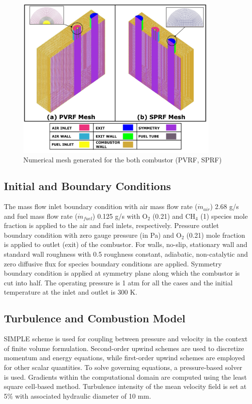 \begin{figure}[!ht]
    \centering
	\includegraphics[width=0.9\textwidth]{Chapter4/Images/Mesh.png}
	\caption{Numerical mesh generated for the both combustor (PVRF, SPRF)}
	\label{Mesh}
\end{figure}

\subsection{Initial and Boundary Conditions}
The mass flow inlet boundary condition with  air mass flow rate ($\dot{m}_{air}$) 2.68 g/s and fuel mass flow rate ($\dot{m}_{fuel}$) 0.125 g/s with O$_2$ (0.21) and CH$_4$ (1) species mole fraction  is applied to the air and fuel inlets, respectively.
Pressure outlet boundary condition with zero gauge pressure (in Pa) and O$_2$ (0.21) mole fraction is applied to outlet (exit) of the combustor.
For walls, no-slip, stationary wall and standard wall roughness with 0.5 roughness constant, adiabatic, non-catalytic and zero diffusive flux for species boundary conditions are applied.
Symmetry boundary condition is applied at symmetry plane along which the combustor is cut into half. The operating pressure is 1 atm for all the cases and the initial temperature at the inlet and outlet is 300 K.

\subsection{Turbulence and Combustion Model}
SIMPLE scheme is used for coupling between pressure and velocity in the context of finite volume formulation. Second-order upwind schemes are used to discretize momentum and energy equations, while first-order upwind schemes are employed for other scalar quantities. To solve governing equations, a pressure-based solver is used. Gradients within the computational domain are computed using the least square cell-based method. Turbulence intensity of the mean velocity field is set at 5$\%$ with associated hydraulic diameter of 10 mm.

